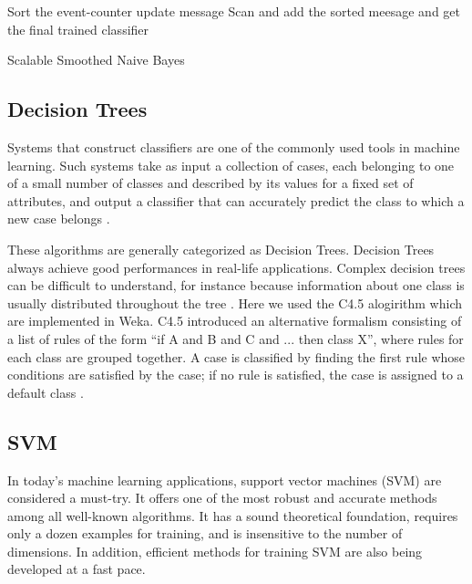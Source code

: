 \begin{center}
\begin{minipage}{.75\linewidth}
\begin{algorithm}[H]

    \BlankLine
    \BlankLine
    Sort the event-counter update message
    \BlankLine
    Scan and add the sorted meesage and get the final trained classifier
    \BlankLine
\caption{Scalable Smoothed Naive Bayes}
\end{algorithm}
\end{minipage}
\end{center}


\subsection{Decision Trees}
Systems that construct classifiers are one of the commonly used tools in machine
learning. Such systems take as input a collection of cases, each belonging to one
of a small number of classes and described by its values for a fixed set of
attributes, and output a classifier that can accurately predict the class to
which a new case belongs \cite{wu2008top}.

These algorithms are generally categorized as Decision Trees. Decision Trees
always achieve good performances in real-life applications. Complex decision
trees can be difficult to understand, for instance because information about one
class is usually distributed throughout the tree \cite{wu2008top}. Here we used
the C4.5 alogirithm which are implemented in Weka. C4.5 introduced an alternative
formalism consisting of a list of rules of the form “if A and B and C and ...
then class X”, where rules for each class are grouped together. A case
is classified by finding the first rule whose conditions are satisfied by the
case; if no rule is satisfied, the case is assigned to a default class
\cite{wu2008top}.


\subsection{SVM}
In today’s machine learning applications, support vector machines (SVM) are
considered a must-try. It offers one of the most robust and accurate methods
among all well-known algorithms. It has a sound theoretical foundation, requires
only a dozen examples for training, and is insensitive to the number of
dimensions. In addition, efficient methods for training SVM are also being
developed at a fast pace\cite{wu2008top}.

